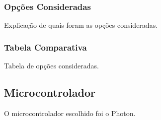 	
	\subsubsection{Opções Consideradas}\label{fpga-options}
	
	Explicação de quais foram as opções consideradas.
	
	\subsubsection{Tabela Comparativa}\label{fpga-table}
	
	Tabela de opções consideradas.
	
	\subsection{Microcontrolador}\label{hard-uc}
	
	O microcontrolador escolhido foi o Photon.
	
